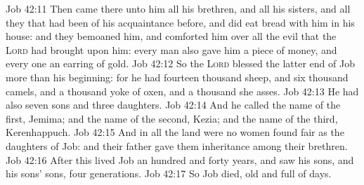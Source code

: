 \vs Job 42:11 Then came there unto him all his brethren, and all his sisters, and all they that had been of his acquaintance before, and did eat bread with him in his house: and they bemoaned him, and comforted him over all the evil that the \textsc{Lord} had brought upon him: every man also gave him a piece of money, and every one an earring of gold.
\vs Job 42:12 So the \textsc{Lord} blessed the latter end of Job more than his beginning: for he had fourteen thousand sheep, and six thousand camels, and a thousand yoke of oxen, and a thousand she asses.
\vs Job 42:13 He had also seven sons and three daughters.
\vs Job 42:14 And he called the name of the first, Jemima; and the name of the second, Kezia; and the name of the third, Kerenhappuch.
\vs Job 42:15 And in all the land were no women found  fair as the daughters of Job: and their father gave them inheritance among their brethren.
\vs Job 42:16 After this lived Job an hundred and forty years, and saw his sons, and his sons' sons,  four generations.
\vs Job 42:17 So Job died,  old and full of days.
